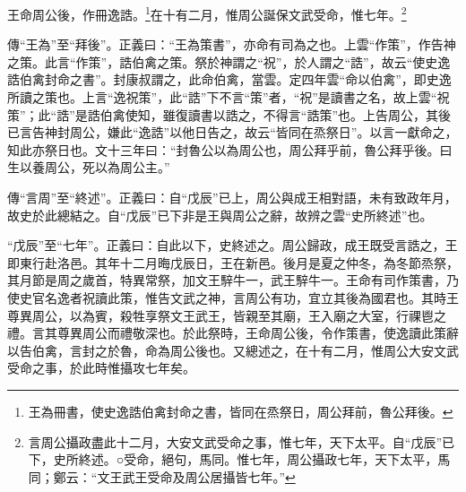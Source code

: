 王命周公後，作冊逸誥。\footnote{王為冊書，使史逸誥伯禽封命之書，皆同在烝祭日，周公拜前，魯公拜後。}在十有二月，惟周公誕保文武受命，惟七年。\footnote{言周公攝政盡此十二月，大安文武受命之事，惟七年，天下太平。自“戊辰”已下，史所終述。○受命，絕句，馬同。惟七年，周公攝政七年，天下太平，馬同；鄭云：“文王武王受命及周公居攝皆七年。”}

{\noindent\zhuan{}\fzbyks 傳“王為”至“拜後”。正義曰：“王為策書”，亦命有司為之也。上雲“作策”，作告神之策。此言“作策”，誥伯禽之策。祭於神謂之“祝”，於人謂之“誥”，故云“使史逸誥伯禽封命之書”。封康叔謂之，此命伯禽，當雲。定四年雲“命以伯禽”，即史逸所讀之策也。上言“逸祝策”，此“誥”下不言“策”者，“祝”是讀書之名，故上雲“祝策”；此“誥”是誥伯禽使知，雖復讀書以誥之，不得言“誥策”也。上告周公，其後已言告神封周公，嫌此“逸誥”以他日告之，故云“皆同在烝祭日”。以言一獻命之，知此亦祭日也。文十三年曰：“封魯公以為周公也，周公拜乎前，魯公拜乎後。曰生以養周公，死以為周公主。” \par}

{\noindent\zhuan{}\fzbyks 傳“言周”至“終述”。正義曰：自“戊辰”已上，周公與成王相對語，未有致政年月，故史於此總結之。自“戊辰”已下非是王與周公之辭，故辨之雲“史所終述”也。 \par}

{\noindent\shu{}\fzkt “戊辰”至“七年”。正義曰：自此以下，史終述之。周公歸政，成王既受言誥之，王即東行赴洛邑。其年十二月晦戊辰日，王在新邑。後月是夏之仲冬，為冬節烝祭，其月節是周之歲首，特異常祭，加文王騂牛一，武王騂牛一。王命有司作策書，乃使史官名逸者祝讀此策，惟告文武之神，言周公有功，宜立其後為國君也。其時王尊異周公，以為賓，殺牲享祭文王武王，皆親至其廟，王入廟之大室，行祼鬯之禮。言其尊異周公而禮敬深也。於此祭時，王命周公後，令作策書，使逸讀此策辭以告伯禽，言封之於魯，命為周公後也。又總述之，在十有二月，惟周公大安文武受命之事，於此時惟攝攻七年矣。 \par}

